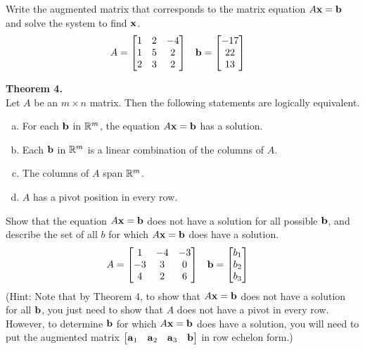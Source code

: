 \begin{exercise} %
	Write the augmented matrix that corresponds to the matrix equation $A\boldsymbol{\mathbf{x}}=\boldsymbol{\mathbf{b}}$ and solve the system to find $\boldsymbol{\mathbf{x}}$.
	\begin{align*}
	A &= \begin{bmatrix}1&2&-4\\1&5&2\\2&3&2\end{bmatrix} &
	\boldsymbol{\mathbf{b}} &= \begin{bmatrix}-17\\22\\13\end{bmatrix}
	\end{align*}
\end{exercise}
\vfill


\newpage


\begin{boxthm}
	\textbf{Theorem 4.} \\
	Let $A$ be an $m\times n$ matrix. Then the following statements are logically equivalent.
	\begin{enumerate}[(a)]\itemsep0em 
		\item For each $\boldsymbol{\mathbf{b}}$ in $\mathbb{R}^m$, the equation $A\boldsymbol{\mathbf{x}}=\boldsymbol{\mathbf{b}}$ has a solution.
		\item Each $\boldsymbol{\mathbf{b}}$ in $\mathbb{R}^m$ is a linear combination of the columns of $A$.
		\item The columns of $A$ span $\mathbb{R}^m$.
		\item $A$ has a pivot position in every row.
	\end{enumerate}
\end{boxthm}

\begin{exercise} %
	Show that the equation $A\boldsymbol{\mathbf{x}}=\boldsymbol{\mathbf{b}}$ does not have a solution for all possible $\boldsymbol{\mathbf{b}}$, and describe the set of all $b$ for which $A\boldsymbol{\mathbf{x}}=\boldsymbol{\mathbf{b}}$ does have a solution.
	\begin{align*}
	A &= \begin{bmatrix}1&-4&-3\\-3&3&0\\4&2&6\end{bmatrix} &
	\boldsymbol{\mathbf{b}} &= \begin{bmatrix}b_1\\b_2\\b_3\end{bmatrix}
	\end{align*}
	(Hint: Note that by Theorem 4, to show that $A\boldsymbol{\mathbf{x}}=\boldsymbol{\mathbf{b}}$ does not have a solution for all $\boldsymbol{\mathbf{b}}$, you just need to show that $A$ does not have a pivot in every row. However, to determine $\boldsymbol{\mathbf{b}}$ for which $A\boldsymbol{\mathbf{x}}=\boldsymbol{\mathbf{b}}$ does have a solution, you will need to put the augmented matrix $\begin{bmatrix}\boldsymbol{\mathbf{a}}_1&\boldsymbol{\mathbf{a}}_2&\boldsymbol{\mathbf{a}}_3&\boldsymbol{\mathbf{b}}\end{bmatrix}$ in row echelon form.)
\end{exercise}
\vfill


